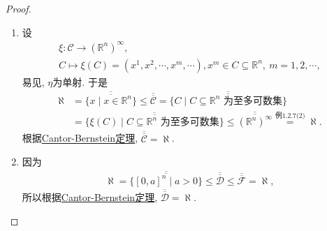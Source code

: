 \documentclass[../../main.tex]{subfiles}%
\begin{document}
\begin{proof}
\begin{enumerate}[(1)]
{\color{blue}证法二:}
设$B \in \mathscr{B}$为只含孤立点的集, 对$B$作由不相交的以有理点为中心, 正有理数为半径的开球, 使得每个这样的开球只含$B$的一个点. 由于这种开球的中心为有理点, 且半径为正有理数, 故这种开球至多可数个. 因而, $B$为至多可数集. 考虑
\begin{gather*}
\xi: \mathscr{B} \to (\mathbb{R}^n)^\infty, \\
B = \{x^1,x^2,\cdots,x^m,\cdots\} \mapsto \xi(B) = (x^1,x^2,\cdots,x^m,\cdots),
\end{gather*}
显然, $\xi$为单射. 且
\begin{align*}
\aleph = \overline{\overline{\{x\mid x \in \mathbb{R}^n\}}} \leqslant \overline{\overline{\mathscr{B}}} = \overline{\overline{\{\xi(B)\mid B \in \mathscr{B}\}}} \leqslant \overline{\overline{(\mathbb{R}^n)^\infty}} = \aleph.
\end{align*}
根据\hyperref[Set-Theory-theorem:Cantor-Bernstein定理]{Cantor-Bernstein定理}, $\overline{\overline{\mathscr{B}}}=\aleph$.

\item 设
\begin{gather*}
\xi: \mathscr{C} \to (\mathbb{R}^n)^\infty, \\
C \mapsto \xi(C) = (x^1,x^2,\cdots,x^m,\cdots),x^m \in C \subseteq \mathbb{R}^n,\ m = 1,2,\cdots,
\end{gather*}
易见, $\eta$为单射. 于是
\begin{align*}
\aleph &= \overline{\overline{\{x\mid x \in \mathbb{R}^n\}}} \leqslant \overline{\overline{\mathscr{C}}} = \overline{\overline{\{C\mid C \subseteq \mathbb{R}^n\text{ 为至多可数集}\}}} \\
&= \overline{\overline{\{\xi(C)\mid C \subseteq \mathbb{R}^n\text{ 为至多可数集}\}}} \leqslant \overline{\overline{(\mathbb{R}^n)^\infty}} \stackrel{\text{例1.2.7(2)}}{=} \aleph.
\end{align*}
根据\hyperref[Set-Theory-theorem:Cantor-Bernstein定理]{Cantor-Bernstein定理}, $\overline{\overline{\mathscr{C}}}=\aleph$.

\item 因为
\begin{align*}
\aleph = \overline{\overline{\{[0,a]^n\mid a > 0\}}} \leqslant \overline{\overline{\mathscr{D}}} \leqslant \overline{\overline{\mathscr{F}}} = \aleph,
\end{align*}
所以根据\hyperref[Set-Theory-theorem:Cantor-Bernstein定理]{Cantor-Bernstein定理}, $\overline{\overline{\mathscr{D}}}=\aleph$.
\end{enumerate}

\end{proof}
\end{document}
